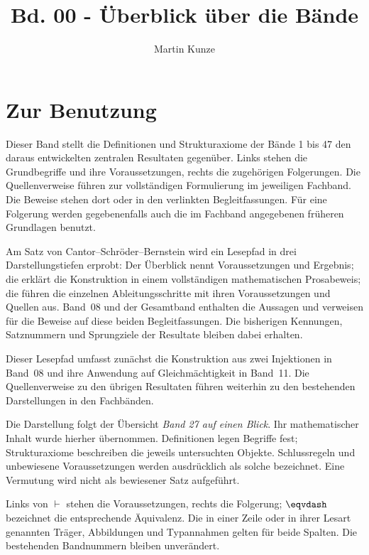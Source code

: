 \documentclass[main.tex]{subfiles}
\title{Bd. 00 - Überblick über die Bände}
\author{Martin Kunze}
\date{}
\begin{document}
\hypersetup{pageanchor=false}
\maketitle
\hypersetup{pageanchor=true}
\setcounter{tocdepth}{0}
\tableofcontents
\setcounter{file}{0}
\renewcommand{\FormulaBandID}{0}


\chapter*{Zur Benutzung}
Dieser Band stellt die Definitionen und Strukturaxiome der Bände 1 bis 47
den daraus entwickelten zentralen Resultaten gegenüber. Links stehen die
Grundbegriffe und ihre Voraussetzungen, rechts die zugehörigen Folgerungen.
Die Quellenverweise führen zur vollständigen Formulierung im jeweiligen
Fachband. Die Beweise stehen dort oder in den verlinkten Begleitfassungen.
Für eine Folgerung werden gegebenenfalls auch die im Fachband angegebenen
früheren Grundlagen benutzt.

Am Satz von Cantor--Schröder--Bernstein wird ein Lesepfad in drei
Darstellungstiefen erprobt: Der Überblick nennt Voraussetzungen und
Ergebnis; die \CSBReadingLink{} erklärt die Konstruktion in einem
vollständigen mathematischen Prosabeweis; die \CSBProofsLink{} führen
die einzelnen Ableitungsschritte mit ihren Voraussetzungen und Quellen
aus. Band~08 und der Gesamtband enthalten die Aussagen und verweisen für
die Beweise auf diese beiden Begleitfassungen. Die bisherigen Kennungen,
Satznummern und Sprungziele der Resultate bleiben dabei erhalten.

Dieser Lesepfad umfasst zunächst die Konstruktion aus zwei Injektionen
in Band~08 und ihre Anwendung auf Gleichmächtigkeit in Band~11.
Die Quellenverweise zu den übrigen Resultaten führen weiterhin zu den
bestehenden Darstellungen in den Fachbänden.

Die Darstellung folgt der Übersicht \emph{Band 27 auf einen Blick}.
Ihr mathematischer Inhalt wurde hierher übernommen. Definitionen legen
Begriffe fest; Strukturaxiome beschreiben die jeweils untersuchten Objekte.
Schlussregeln und unbewiesene Voraussetzungen werden ausdrücklich als solche
bezeichnet. Eine Vermutung wird nicht als bewiesener Satz aufgeführt.

Links von \(\vdash\) stehen die Voraussetzungen, rechts die Folgerung;
\(\eqvdash\) bezeichnet die entsprechende Äquivalenz. Die in einer Zeile
oder in ihrer Lesart genannten Träger, Abbildungen und Typannahmen gelten
für beide Spalten. Die bestehenden Bandnummern bleiben unverändert.
\end{document}
